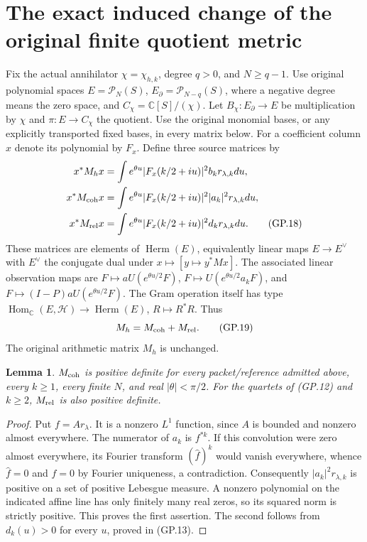 \documentclass[11pt]{article}
\newtheorem{lemma}[theorem]{Lemma}
\newcommand{\C}{\mathbb C}
\newcommand{\HH}{\mathcal H}
\newcommand{\PP}{\mathcal P}
\begin{document}
\section{The exact induced change of the original finite quotient metric}
Fix the actual annihilator $\chi=\chi_{h,k}$, degree $q>0$, and
$N\geq q-1$. Use original polynomial spaces
$E=\PP_N(S)$, $E_\partial=\PP_{N-q}(S)$, where a negative degree
means the zero space, and $C_\chi=\C[S]/(\chi)$. Let
$B_\chi:E_\partial\to E$ be multiplication by $\chi$ and
$\pi:E\to C_\chi$ the quotient. Use the original monomial bases,
or any explicitly transported fixed bases, in every matrix below.
For a coefficient column $x$ denote its polynomial by $F_x$.
Define three source matrices by
\begin{align}
 x^*M_hx&=\int e^{\theta u}|F_x(k/2+iu)|^2b_k r_{\lambda,k}du,
 \nonumber\\
 x^*M_{\rm coh}x&=\int e^{\theta u}|F_x(k/2+iu)|^2|a_k|^2r_{\lambda,k}du,
 \nonumber\\
 x^*M_{\rm rel}x&=\int e^{\theta u}|F_x(k/2+iu)|^2d_kr_{\lambda,k}du.
 \tag{GP.18}
\end{align}
These matrices are elements of $\operatorname{Herm}(E)$, equivalently
linear maps $E\to E^\vee$ with $E^\vee$ the conjugate dual under
$x\mapsto[y\mapsto y^*Mx]$. The associated linear observation maps are
$F\mapsto aU(e^{\theta u/2}F)$,
$F\mapsto U(e^{\theta u/2}a_kF)$, and
$F\mapsto (I-P)aU(e^{\theta u/2}F)$.
The Gram operation itself has type
$\operatorname{Hom}_{\C}(E,\HH)\to\operatorname{Herm}(E)$,
$R\mapsto R^*R$. Thus
\begin{equation}
 M_h=M_{\rm coh}+M_{\rm rel}.
 \tag{GP.19}
\end{equation}
The original arithmetic matrix $M_h$ is unchanged.

\begin{lemma}
$M_{\rm coh}$ is positive definite for every packet/reference admitted
above, every $k\geq1$, every finite $N$, and real $|\theta|<\pi/2$.
For the quartets of (GP.12) and $k\geq2$, $M_{\rm rel}$ is also
positive definite.
\end{lemma}
\begin{proof}
Put $f=Ar_\lambda$. It is a nonzero $L^1$ function, since $A$ is
bounded and nonzero almost everywhere. The numerator of $a_k$ is
$f^{*k}$. If this convolution were zero almost everywhere, its
Fourier transform $(\widehat f)^k$ would vanish everywhere, whence
$\widehat f=0$ and $f=0$ by Fourier uniqueness, a contradiction.
Consequently $|a_k|^2r_{\lambda,k}$ is positive on a set of positive
Lebesgue measure. A nonzero polynomial on the indicated affine line
has only finitely many real zeros, so its squared norm is strictly
positive. This proves the first assertion. The second follows
from $d_k(u)>0$ for every $u$, proved in (GP.13).
\end{proof}
\end{document}
